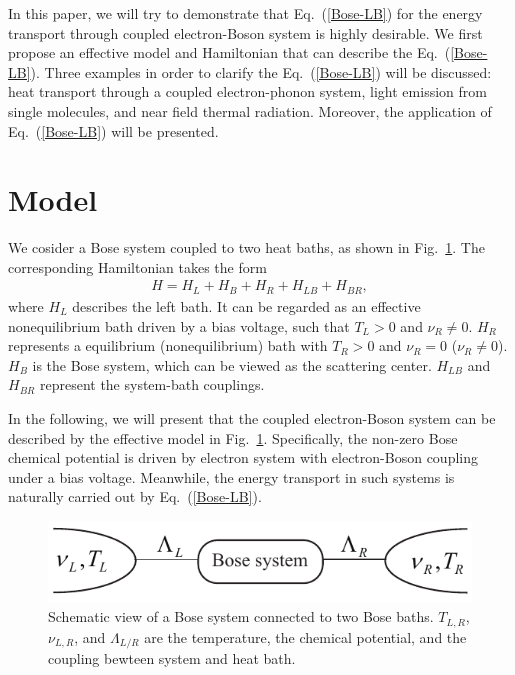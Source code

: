 \documentclass[aps
,floatfix,footinbib,
preprint
]{revtex4-1}
\begin{document}
In this paper, we will try to demonstrate that Eq.~(\ref{Bose-LB}) for the energy transport through coupled electron-Boson system is highly desirable. We first propose an effective model and Hamiltonian that can describe the Eq.~(\ref{Bose-LB}). Three examples in order to clarify the Eq.~(\ref{Bose-LB}) will be discussed: heat transport through a coupled electron-phonon system, light emission from single molecules, and near field thermal radiation.
Moreover, the application of Eq.~(\ref{Bose-LB}) will be presented.

\section{Model}
We cosider a Bose system coupled to two heat baths, as shown in Fig.~\ref{Fig01}. The corresponding Hamiltonian takes the form
\begin{equation}
\begin{split}
H=H_{L}+H_{B}+H_{R}+H_{LB}+H_{BR},
\end{split}
\label{hamiltonian}
\end{equation}
where $H_{L}$ describes the left bath. It can be regarded as an effective nonequilibrium bath driven by a bias voltage, such that $T_{L}>0$ and $\nu_{R}\neq0$. $H_{R}$ represents a equilibrium (nonequilibrium) bath with $T_{R}>0$ and $\nu_{R}=0$ ($\nu_{R}\neq0$). $H_{B}$ is the Bose system, which can be viewed as the scattering center. $H_{LB}$ and $H_{BR}$ represent the system-bath couplings.

In the following, we will present that the coupled electron-Boson system can be described by the effective model in Fig.~\ref{Fig01}. Specifically, the non-zero Bose chemical potential is driven by electron system with electron-Boson coupling under a bias voltage. Meanwhile, the energy transport in such systems is naturally carried out by Eq.~(\ref{Bose-LB}).
%
\begin{figure}[h]
\centering
\includegraphics[width=8 cm]{photon-Landauer.pdf}
\caption{ Schematic view of a Bose system connected to two Bose baths. $T_{L,R}$, $\nu_{L,R}$, and $\Lambda_{L/R}$ are the temperature, the chemical potential, and the coupling bewteen system and heat bath.}
\label{Fig01}
\end{figure}
%
\end{document}
